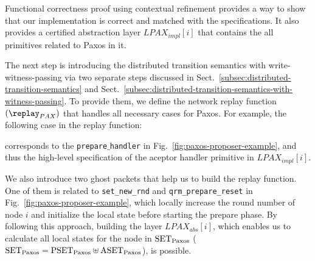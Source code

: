 Functional correctness proof using contextual refinement provides a way to show that our implementation is correct and matched with the specifications. 
It also provides a certified abstraction layer $LPAX_{impl}[i]$ that contains the all primitives related to Paxos in it.

The next step is introducing the distributed transition semantics with write-witness-passing 
via two separate steps discussed in Sect.~\ref{subsec:distributed-transition-semantics} and Sect.~\ref{subsec:distributed-transition-semantics-with-witness-passing}.
To provide them, we define the network replay function $(\replay_{PAX})$ that handles all necessary cases for Paxos. 
For example, 
the following case in the replay function:

corresponds to the \texttt{prepare$\_$handler} in Fig.~\ref{fig:paxos-proposer-example}, and thus the 
high-level specification of the aceptor handler  primitive in  $LPAX_{impl}[i]$.

We also introduce two ghost packets that help us to build the replay function. 
One of them is related to \texttt{set\_new\_rnd} and  \texttt{qrm\_prepare\_reset}   
in Fig.~\ref{fig:paxos-proposer-example}, which locally increase 
the round number of node $i$ and initialize the local state before 
starting the prepare phase. 
By following this approach, building the layer $LPAX_{abs}[i]$, which enables us to 
calculate all local states for the node in $\mathrm{SET}_{\mathrm{Paxos}}$ ($\mathrm{SET}_{\mathrm{Paxos}} = \mathrm{PSET}_{\mathrm{Paxos}} \uplus \mathrm{ASET}_{\mathrm{Paxos}}$), is possible.

